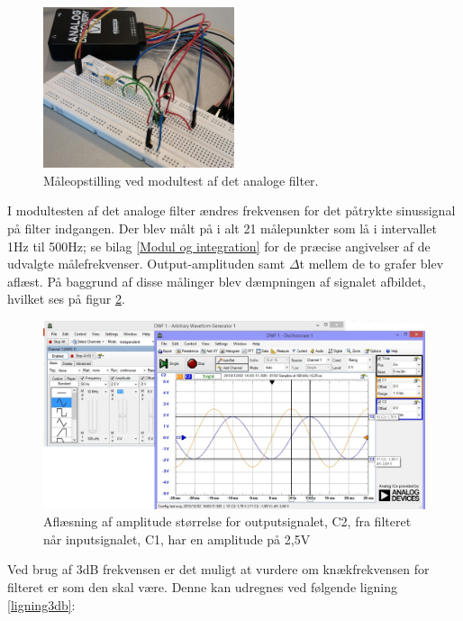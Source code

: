 \begin{figure}[H]
	\centering
	\includegraphics[width=0.5\textwidth]{Figurer/Hardware/FilterTest}
	\caption{Måleopstilling ved modultest af det analoge filter.}
	\label{fig:FilterTest}
\end{figure}

I modultesten af det analoge filter ændres frekvensen for det påtrykte sinussignal på filter indgangen. Der blev målt på i alt 21 målepunkter som lå i intervallet 1Hz til 500Hz; se bilag \ref{Modul og integration} for de præcise angivelser af de udvalgte målefrekvenser. Output-amplituden samt $\Delta$t mellem de to grafer blev aflæst. På baggrund af disse målinger blev dæmpningen af signalet afbildet, hvilket ses på figur \ref{fig:FilterAmplitude}. 

\begin{figure}[H]
	\centering
	\includegraphics[width=1\textwidth]{Figurer/Hardware/AnalogScreenFilterAmp}
	\caption{Aflæsning af amplitude størrelse for outputsignalet, C2, fra filteret når inputsignalet, C1, har en amplitude på 2,5V}
	\label{fig:FilterAmplitude}
\end{figure}

Ved brug af 3dB frekvensen er det muligt at vurdere om knækfrekvensen for filteret er som den skal være. Denne kan udregnes ved følgende ligning \ref{ligning3db}:

